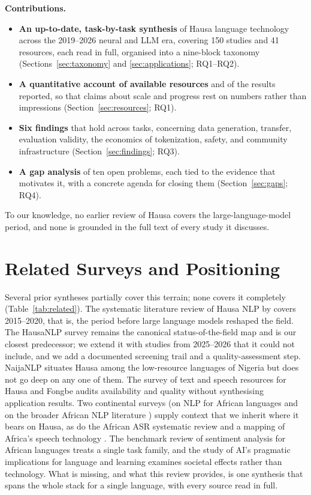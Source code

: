 \documentclass[sn-basic,pdflatex]{sn-jnl}
\begin{document}
\medskip
\noindent\textbf{Contributions.}
\begin{itemize}\itemsep2pt
  \item \textbf{An up-to-date, task-by-task synthesis} of Hausa language technology across the 2019--2026 neural and LLM era, covering 150 studies and 41 resources, each read in full, organised into a nine-block taxonomy (Sections~\ref{sec:taxonomy} and \ref{sec:applications}; RQ1--RQ2).
  \item \textbf{A quantitative account of available resources} and of the results reported, so that claims about scale and progress rest on numbers rather than impressions (Section~\ref{sec:resources}; RQ1).
  \item \textbf{Six findings} that hold across tasks, concerning data generation, transfer, evaluation validity, the economics of tokenization, safety, and community infrastructure (Section~\ref{sec:findings}; RQ3).
  \item \textbf{A gap analysis} of ten open problems, each tied to the evidence that motivates it, with a concrete agenda for closing them (Section~\ref{sec:gaps}; RQ4).
\end{itemize}
To our knowledge, no earlier review of Hausa covers the large-language-model period, and none is grounded in the full text of every study it discusses.

\section{Related Surveys and Positioning}\label{sec:related}
Several prior syntheses partially cover this terrain; none covers it completely (Table~\ref{tab:related}). The systematic literature review of Hausa NLP by \citet{p004} covers 2015--2020, that is, the period before large language models reshaped the field. The HausaNLP survey \citep{p005} remains the canonical status-of-the-field map and is our closest predecessor; we extend it with studies from 2025--2026 that it could not include, and we add a documented screening trail and a quality-assessment step. NaijaNLP \citep{p006} situates Hausa among the low-resource languages of Nigeria but does not go deep on any one of them. The survey of text and speech resources for Hausa and Fongbe \citep{p007} audits availability and quality without synthesising application results. Two continental surveys (on NLP for African languages \citep{p077} and on the broader African NLP literature \citep{p078}) supply context that we inherit where it bears on Hausa, as do the African ASR systematic review \citep{p043} and a mapping of Africa's speech technology \citep{p042}. The benchmark review of sentiment analysis for African languages \citep{p133} treats a single task family, and the study of AI's pragmatic implications for language and learning \citep{p082} examines societal effects rather than technology. What is missing, and what this review provides, is one synthesis that spans the whole stack for a single language, with every source read in full.
\end{document}
